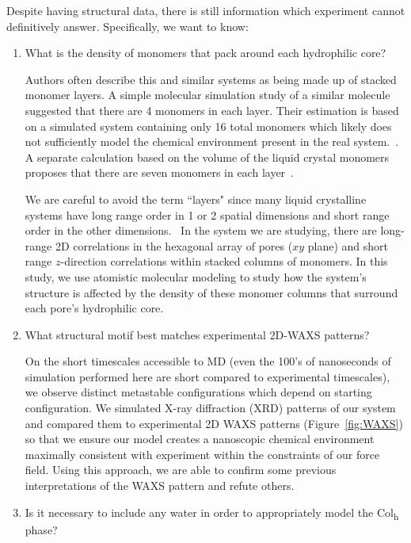  Despite having structural data, there is still information which experiment
 cannot definitively answer. Specifically, we want to know:
 \begin{enumerate}
    \item What is the density of monomers that pack around each hydrophilic core? 
    \label{point:monomernum}

	Authors often describe this and similar systems as being made up of
	stacked monomer layers. A simple molecular simulation study of a similar
	molecule suggested that there are 4 monomers in each layer. Their estimation is
	based on a simulated system containing only 16 total monomers which likely does
	not sufficiently model the chemical environment present in the real
	system.~\cite{zhu_methacrylated_2006}. A separate calculation based on the
	volume of the liquid crystal monomers proposes that there are seven monomers in
	each layer~\cite{resel_structural_2000}. 

	We are careful to avoid the term ``layers" since many liquid
	crystalline systems have long range order in 1 or 2 spatial dimensions and
	short range order in the other dimensions.~\cite{chaikin_principles_1995}  %
	In the system we are studying, there are long-range 2D correlations in
	the hexagonal array of pores ($xy$ plane) and short range $z$-direction
	correlations within stacked columns of monomers. In this study, we use
	atomistic molecular modeling to study how the system's structure is affected by
	the density of these monomer columns that surround each pore's hydrophilic
	core. 

	\item What structural motif best matches experimental 2D-WAXS patterns?\label{point:xrdmatch}

	On the short timescales accessible to MD (even the 100's of nanoseconds
	of simulation performed here are short compared to experimental timescales), we
	observe distinct metastable configurations which depend on starting
	configuration. We simulated X-ray diffraction (XRD) patterns of our system and
	compared them to experimental 2D WAXS patterns (Figure~\ref{fig:WAXS}) so that
	we ensure our model creates a nanoscopic chemical environment maximally
	consistent with experiment within the constraints of our force field. Using
	this approach, we are able to confirm some previous interpretations	of the
	WAXS pattern and refute others. 

        \item Is it necessary to include any water in order to appropriately model the 
        Col\textsubscript{h} phase? \label{point:water}


\end{enumerate}
